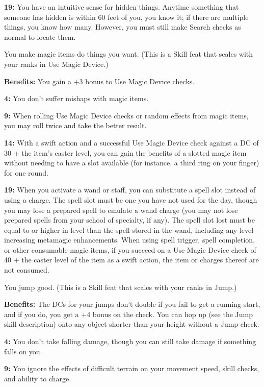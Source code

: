 \textbf{19:} You have an intuitive sense for hidden things. Anytime something that someone has hidden is within 60 feet of you, you know it; if there are multiple things, you know how many. However, you must still make Search checks as normal to locate them.


You make magic items do things you want. (This is a Skill feat that scales with your ranks in Use Magic Device.)

\textbf{Benefits:} You gain a +3 bonus to Use Magic Device checks.

\textbf{4:} You don't suffer mishaps with magic items.

\textbf{9:} When rolling Use Magic Device checks or random effects from magic items, you may roll twice and take the better result.

\textbf{14:} With a swift action and a successful Use Magic Device check against a DC of 30 + the item's caster level, you can gain the benefits of a slotted magic item without needing to have a slot available (for instance, a third ring on your finger) for one round.

\textbf{19:} When you activate a wand or staff, you can substitute a spell slot instead of using a charge. The spell slot must be one you have not used for the day, though you may lose a prepared spell to emulate a wand charge (you may not lose prepared spells from your school of specialty, if any). The spell slot lost must be equal to or higher in level than the spell stored in the wand, including any level-increasing metamagic enhancements. When using spell trigger, spell completion, or other consumable magic items, if you succeed on a Use Magic Device check of 40 + the caster level of the item as a swift action, the item or charges thereof are not consumed.


You jump good. (This is a Skill feat that scales with your ranks in Jump.)

\textbf{Benefits:} The DCs for your jumps don't double if you fail to get a running start, and if you do, you get a +4 bonus on the check. You can hop up (see the Jump skill description) onto any object shorter than your height without a Jump check.

\textbf{4:} You don't take falling damage, though you can still take damage if something falls on you.

\textbf{9:} You ignore the effects of difficult terrain on your movement speed, skill checks, and ability to charge.

